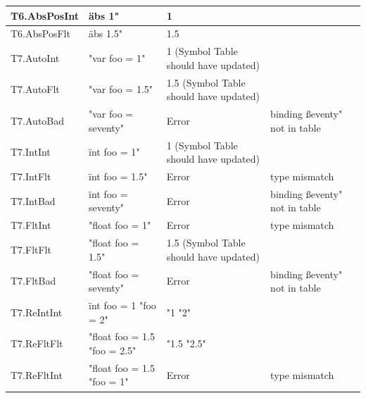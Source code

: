 \documentclass[a4paper, oneside, 11pt]{report}
\begin{document}
\begin{table}
\begin{tabular}{|p{1.5in}|p{1.5in}|p{1.6in}|p{1.6in}|p{2.4in}|}
\hline
T6.AbsPosInt   & äbs 1"                                         & 1                                        &                                        \\ 
\hline
T6.AbsPosFlt   & äbs 1.5"                                       & 1.5                                      &                                        \\ 
\hline
T7.AutoInt     & "var foo = 1"                                  & 1 (Symbol Table should have updated)     &                                        \\ 
\hline
T7.AutoFlt     & "var foo = 1.5"                                & 1.5 (Symbol Table should have updated)   &                                        \\ 
\hline
T7.AutoBad     & "var foo = seventy"                            & Error                                    & binding ßeventy" not in table          \\ 
\hline
T7.IntInt      & ïnt foo = 1"                                   & 1 (Symbol Table should have updated)     &                                        \\ 
\hline
T7.IntFlt      & ïnt foo = 1.5"                                 & Error                                    & type mismatch                          \\ 
\hline
T7.IntBad      & ïnt foo = seventy"                             & Error                                    & binding ßeventy" not in table          \\ 
\hline
T7.FltInt      & "float foo = 1"                                & Error                                    & type mismatch                          \\ 
\hline
T7.FltFlt      & "float foo = 1.5"                              & 1.5 (Symbol Table should have updated)   &                                        \\ 
\hline
T7.FltBad      & "float foo = seventy"                          & Error                                    & binding ßeventy" not in table          \\ 
\hline
T7.ReIntInt    & ïnt foo = 1 "foo = 2"                          & "1 "2"                                   &                                        \\ 
\hline
T7.ReFltFlt    & "float foo = 1.5 "foo = 2.5"                   & "1.5 "2.5"                               &                                        \\ 
\hline
T7.ReFltInt    & "float foo = 1.5 "foo = 1"                     & Error                                    & type mismatch                          \\ 

\end{tabular}
\end{table}
\end{document}
